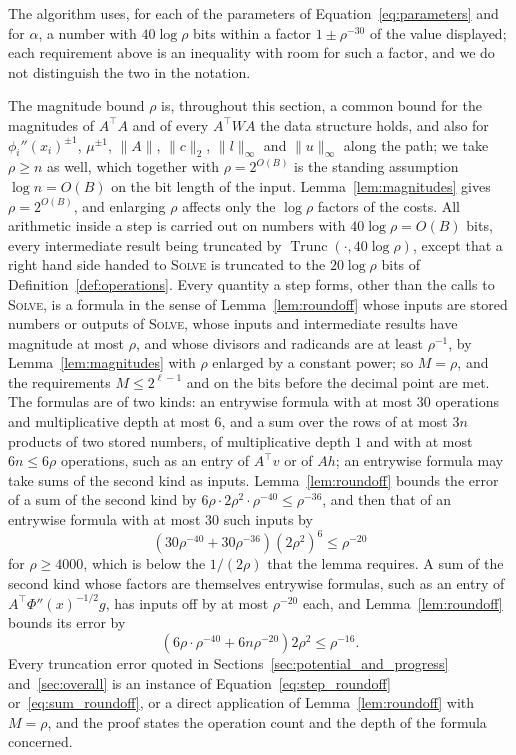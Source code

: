 \documentclass[11pt]{article}
\newcommand{\Trunc}{\operatorname{Trunc}}
\begin{document}
The algorithm uses, for each of the parameters of Equation~\eqref{eq:parameters}
and for $\alpha$, a number with
$40 \log \rho$ bits within a factor
$1 \pm \rho^{-30}$ of the value displayed; each requirement above is an
inequality with room for such a factor, and we do not distinguish the two in the
notation.

The magnitude bound $\rho$ is, throughout this section, a common bound for the
magnitudes of $A^\top A$ and of every
$A^\top W A$ the data structure holds, and also for
$\phi_i''(x_i)^{\pm 1}$,
$\mu^{\pm 1}$,
$\|A\|$,
$\|c\|_2$,
$\|l\|_{\infty}$ and
$\|u\|_{\infty}$ along the path; we take
$\rho \ge n$ as well, which together with
$\rho = 2^{O(B)}$ is the standing assumption
$\log n = O(B)$ on the bit length of the input.
Lemma~\ref{lem:magnitudes} gives $\rho = 2^{O(B)}$, and enlarging
$\rho$ affects only the
$\log \rho$ factors of the costs.
All arithmetic inside a step is carried out on numbers with
$40 \log \rho = O(B)$ bits, every intermediate result being truncated by
$\Trunc(\cdot, 40 \log \rho)$, except that a right hand side handed to
\textsc{Solve} is truncated to the $20 \log \rho$ bits of
Definition~\ref{def:operations}.
Every quantity a step forms, other than the calls to \textsc{Solve}, is a
formula in the sense of Lemma~\ref{lem:roundoff} whose inputs are stored numbers
or outputs of \textsc{Solve}, whose inputs and intermediate results have
magnitude at most $\rho$, and whose divisors and radicands are at least
$\rho^{-1}$, by Lemma~\ref{lem:magnitudes} with
$\rho$ enlarged by a constant power; so
$M = \rho$, and the requirements
$M \le 2^{\ell - 1}$ and on the bits before the decimal point are met.
The formulas are of two kinds: an entrywise formula with at most $30$ operations
and multiplicative depth at most $6$, and a sum over the rows of at most
$3 n$ products of two stored numbers, of multiplicative depth
$1$ and with at most
$6 n \le 6 \rho$ operations, such as an entry of
$A^\top v$ or of
$A h$; an entrywise formula may take sums of the second kind as inputs.
Lemma~\ref{lem:roundoff} bounds the error of a sum of the second kind by
$6 \rho \cdot 2 \rho^{2} \cdot \rho^{-40} \le \rho^{-36}$, and then that of an
entrywise formula with at most $30$ such inputs by
\begin{equation}
\label{eq:step_roundoff}
\left( 30 \rho^{-40} + 30 \rho^{-36} \right) \left( 2 \rho^{2} \right)^{6}
\le
\rho^{-20}
\end{equation}
for $\rho \ge 4000$, which is below the
$1 / (2 \rho)$ that the lemma requires.
A sum of the second kind whose factors are themselves entrywise formulas, such
as an entry of $A^\top \Phi''(x)^{-1/2} g$, has inputs off by at most
$\rho^{-20}$ each, and Lemma~\ref{lem:roundoff} bounds its error by
\begin{equation}
\label{eq:sum_roundoff}
\left( 6 \rho \cdot \rho^{-40} + 6 n \rho^{-20} \right) 2 \rho^{2}
\le
\rho^{-16} .
\end{equation}
Every truncation error quoted in Sections~\ref{sec:potential_and_progress}
and~\ref{sec:overall} is an instance of Equation~\eqref{eq:step_roundoff}
or~\eqref{eq:sum_roundoff}, or a direct application of Lemma~\ref{lem:roundoff}
with $M = \rho$, and the proof states the operation count and the depth of the
formula concerned.
\end{document}

